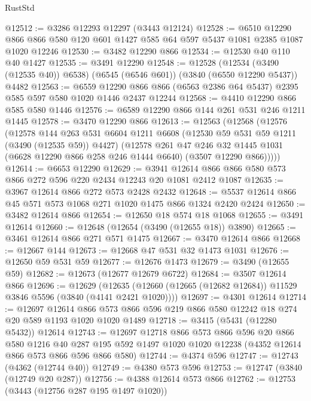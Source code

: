 \begin{lexlean}{RustStd}
\begin{coremodule}
{\begin{coremodule}
{{{{{{{{{{{{{{{{{{{{{{{{{{@12512 := @3286 @12293 @12297 (@3443 @12124)
@12528 := @6510
    @12290
    @866
    @866
    @580
    @120
    @601
    @1427
    @585
    @64
    @597
    @5437
    @1081
    @2385
    @1087
    @1020
    @12246
@12530 := @3482 @12290 @866
@12534 := @12530 @40 @110 @40 @1427
@12535 := @3491 @12290
@12548 := @12528
    (@12534 (@3490 (@12535 @40)) @6538)
    (@6545 (@6546 @601))
    (@3840 (@6550 @12290 @5437))
    @4482
@12563 := @6559
    @12290
    @866
    @866
    (@6563 @2386 @64 @5437)
    @2395
    @585
    @597
    @580
    @1020
    @1446
    @2437
    @12244
@12568 := @4410 @12290 @866 @585 @580 @1446
@12576 := @6589 @12290 @866 @144 @261 @531 @246 @1211 @1445
@12578 := @3470 @12290 @866
@12613 := @12563
    (@12568
      (@12576
        (@12578
          @144
          @263
          @531
          @6604
          @1211
          @6608
          (@12530 @59 @531 @59 @1211 (@3490 (@12535 @59)) @4427)
          (@12578
            @261
            @47
            @246
            @32
            @1445
            @1031
            (@6628 @12290 @866 @258 @246 @1444 @6640)
            (@3507 @12290 @866)))))
@12614 := @6653 @12290
@12629 := @3941 @12614 @866 @866 @580 @573 @866 @272 @596 @220 @2434 @12243 @20 @1081 @2412 @1087
@12635 := @3967 @12614 @866 @272 @573 @2428 @2432
@12648 := @5537 @12614 @866 @45 @571 @573 @1068 @271 @1020 @1475 @866 @1324 @2420 @2424
@12650 := @3482 @12614 @866
@12654 := @12650 @18 @574 @18 @1068
@12655 := @3491 @12614
@12660 := @12648 (@12654 (@3490 (@12655 @18)) @3890)
@12665 := @3461 @12614 @866 @271 @571 @1475
@12667 := @3470 @12614 @866
@12668 := @12667 @144
@12673 := @12668 @47 @531 @32 @1473 @1031
@12676 := @12650 @59 @531 @59
@12677 := @12676 @1473
@12679 := @3490 (@12655 @59)
@12682 := @12673 (@12677 @12679 @6722)
@12684 := @3507 @12614 @866
@12696 := @12629
    (@12635 (@12660 (@12665 (@12682 @12684)) @11529 @3846 @5596 (@3840 (@4141 @2421 @1020))))
@12697 := @4301 @12614
@12714 := @12697
    @12614
    @866
    @573
    @866
    @596
    @219
    @866
    @580
    @12242
    @18
    @274
    @20
    @589
    @1193
    @1020
    @1020
    @1489
@12718 := @3415 (@5431 (@12280 @5432)) @12614
@12743 := @12697
    @12718
    @866
    @573
    @866
    @596
    @20
    @866
    @580
    @1216
    @40
    @287
    @195
    @592
    @1497
    @1020
    @1020
    @12238
    (@4352 @12614 @866 @573 @866 @596 @866 @580)
@12744 := @4374 @596
@12747 := @12743 (@4362 (@12744 @40))
@12749 := @4380 @573 @596
@12753 := @12747 (@3840 (@12749 @20 @287))
@12756 := @4388 @12614 @573 @866
@12762 := @12753 (@3443 (@12756 @287 @195 @1497 @1020))
}}}}}}}}}}}}}}}}}}}}}}}}}}
\end{coremodule}}
\end{coremodule}
\end{lexlean}
